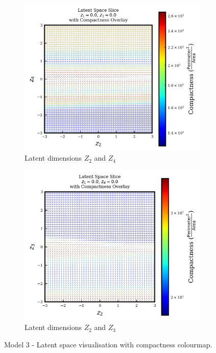 \documentclass{article}
\begin{document}
\begin{figure}[H]
  \vspace{0.5em}

  \begin{subfigure}{0.48\textwidth}
    \centering
    \includegraphics[width=\textwidth]{figures/VAEmodels/model3/varying_z2_z4_fixed_z1=0.0_z3=0.0.png}
    \caption{Latent dimensions $Z_2$ and $Z_4$}
    \label{fig:model3_z2_z4}
  \end{subfigure}
  \hfill
  \begin{subfigure}{0.48\textwidth}
    \centering
    \includegraphics[width=\textwidth]{figures/VAEmodels/model3/varying_z2_z3_fixed_z1=0.0_z4=0.0.png}
    \caption{Latent dimensions $Z_2$ and $Z_3$}
    \label{fig:model3_z2_z3}
  \end{subfigure}

  \caption{Model 3 - Latent space visualisation with compactness colourmap.}
  \label{fig:model3_latent_visualisations}
\end{figure}
\end{document}
